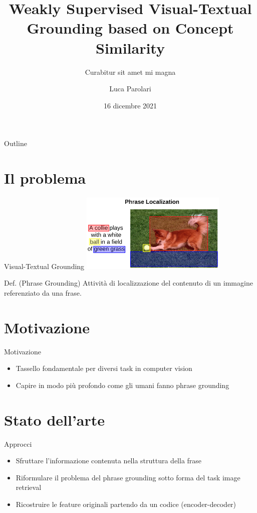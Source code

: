 \documentclass{beamer}
\title{Weakly Supervised Visual-Textual Grounding based on Concept Similarity}
\subtitle{Curabitur sit amet mi magna}
\author{Luca Parolari}
\date{16 dicembre 2021}
\begin{document}
\maketitle

\begin{frame}{Outline}
  \tableofcontents
\end{frame}

\section{Il problema}

\begin{frame}{Visual-Textual Grounding}
  \centering
  \includegraphics[width=7cm]{images/dog-playing-with-ball.png}

  \vspace{0.5cm}

  \begin{alertblock}{Def. (Phrase Grounding)}
    Attività di localizzazione del contenuto di un immagine referenziato da una
    frase.
  \end{alertblock}
\end{frame}

\section{Motivazione}

\begin{frame}{Motivazione}
  \begin{itemize}
    \item Tassello fondamentale per diversi task in computer vision
    \item Capire in modo più profondo come gli umani fanno phrase grounding
  \end{itemize}
\end{frame}

\section{Stato dell'arte}

\begin{frame}{Approcci}
  \begin{itemize}
    \item Sfruttare l'informazione contenuta nella \alert{struttura
    della frase}
    \item Riformulare il problema del phrase grounding sotto forma del
    task \alert{image retrieval}
    \item \alert{Ricostruire} le feature originali partendo da un
    codice (encoder-decoder)
  \end{itemize}
\end{frame}
\end{document}
